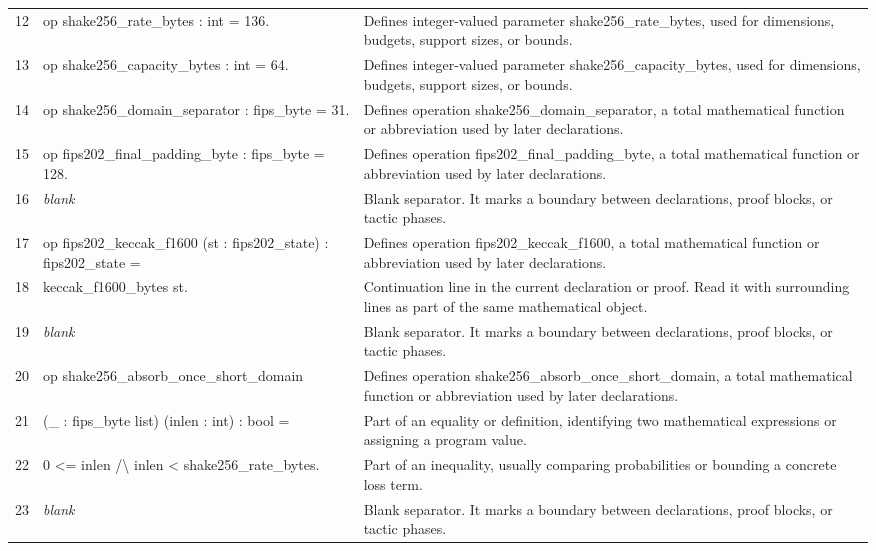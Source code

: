\documentclass[10pt]{article}
\begin{document}
\begin{longtable}{r L{0.53\textwidth} L{0.37\textwidth}}
12 & {\ttfamily\scriptsize op shake256\_rate\_bytes : int = 136.} & Defines integer-valued parameter shake256\_rate\_bytes, used for dimensions, budgets, support sizes, or bounds. \\
13 & {\ttfamily\scriptsize op shake256\_capacity\_bytes : int = 64.} & Defines integer-valued parameter shake256\_capacity\_bytes, used for dimensions, budgets, support sizes, or bounds. \\
14 & {\ttfamily\scriptsize op shake256\_domain\_separator : fips\_byte = 31.} & Defines operation shake256\_domain\_separator, a total mathematical function or abbreviation used by later declarations. \\
15 & {\ttfamily\scriptsize op fips202\_final\_padding\_byte : fips\_byte = 128.} & Defines operation fips202\_final\_padding\_byte, a total mathematical function or abbreviation used by later declarations. \\
16 & {\ttfamily\scriptsize \emph{blank}} & Blank separator.  It marks a boundary between declarations, proof blocks, or tactic phases. \\
17 & {\ttfamily\scriptsize op fips202\_keccak\_f1600 (st : fips202\_state) : fips202\_state =} & Defines operation fips202\_keccak\_f1600, a total mathematical function or abbreviation used by later declarations. \\
18 & {\ttfamily\scriptsize   keccak\_f1600\_bytes st.} & Continuation line in the current declaration or proof.  Read it with surrounding lines as part of the same mathematical object. \\
19 & {\ttfamily\scriptsize \emph{blank}} & Blank separator.  It marks a boundary between declarations, proof blocks, or tactic phases. \\
20 & {\ttfamily\scriptsize op shake256\_absorb\_once\_short\_domain} & Defines operation shake256\_absorb\_once\_short\_domain, a total mathematical function or abbreviation used by later declarations. \\
21 & {\ttfamily\scriptsize    (\_ : fips\_byte list) (inlen : int) : bool =} & Part of an equality or definition, identifying two mathematical expressions or assigning a program value. \\
22 & {\ttfamily\scriptsize   0 <= inlen /\textbackslash{} inlen < shake256\_rate\_bytes.} & Part of an inequality, usually comparing probabilities or bounding a concrete loss term. \\
23 & {\ttfamily\scriptsize \emph{blank}} & Blank separator.  It marks a boundary between declarations, proof blocks, or tactic phases. \\

\end{longtable}
\end{document}
